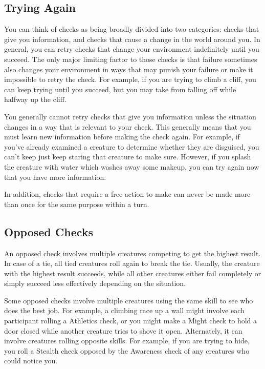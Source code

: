   \subsection{Trying Again}
    You can think of checks as being broadly divided into two categories: checks that give you information, and checks that cause a change in the world around you.
    In general, you can retry checks that change your environment indefinitely until you succeed.
    The only major limiting factor to those checks is that failure sometimes also changes your environment in ways that may punish your failure or make it impossible to retry the check.
    For example, if you are trying to climb a cliff, you can keep trying until you succeed, but you may take  from falling off while halfway up the cliff.

    You generally cannot retry checks that give you information unless the situation changes in a way that is relevant to your check.
    This generally means that you must learn new information before making the check again.
    For example, if you've already examined a creature to determine whether they are disguised, you can't keep just keep staring that creature to make sure.
    However, if you splash the creature with water which washes away some makeup, you can try again now that you have more information.

    In addition, checks that require a free action to make can never be made more than once for the same purpose within a turn.

  \subsection{Opposed Checks}
    An opposed check involves multiple creatures competing to get the highest result.
    In case of a tie, all tied creatures roll again to break the tie.
    Usually, the creature with the highest result succeeds, while all other creatures either fail completely or simply succeed less effectively depending on the situation.

    Some opposed checks involve multiple creatures using the same skill to see who does the best job.
    For example, a climbing race up a wall might involve each participant rolling a Athletics check, or you might make a Might check to hold a door closed while another creature tries to shove it open.
    Alternately, it can involve creatures rolling opposite skills.
    For example, if you are trying to hide, you roll a Stealth check opposed by the Awareness check of any creatures who could notice you.

